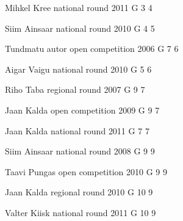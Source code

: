 \documentclass[11pt]{article}
\begin{document}
\ylDisplay{} %
{Mihkel Kree} %
{national round} %
{2011} %
{G 3} %
{4} %
{

\ifEngStatement
\fi
}

\ylDisplay{} %
{Siim Ainsaar} %
{national round} %
{2010} %
{G 4} %
{5} %
{

\ifEngStatement
\fi
}

\ylDisplay{} %
{Tundmatu autor} %
{open competition} %
{2006} %
{G 7} %
{6} %
{

\ifEngStatement
\fi
}

\ylDisplay{} %
{Aigar Vaigu} %
{national round} %
{2010} %
{G 5} %
{6} %
{

\ifEngStatement
\fi
}

\ylDisplay{} %
{Riho Taba} %
{regional round} %
{2007} %
{G 9} %
{7} %
{

\ifEngStatement
\fi
}

\ylDisplay{} %
{Jaan Kalda} %
{open competition} %
{2009} %
{G 9} %
{7} %
{

\ifEngStatement
\fi
}

\ylDisplay{} %
{Jaan Kalda} %
{national round} %
{2011} %
{G 7} %
{7} %
{

\ifEngStatement
\fi
}

\ylDisplay{} %
{Siim Ainsaar} %
{national round} %
{2008} %
{G 9} %
{9} %
{

\ifEngStatement
\fi
}

\ylDisplay{} %
{Taavi Pungas} %
{open competition} %
{2010} %
{G 9} %
{9} %
{

\ifEngStatement
\fi
}

\ylDisplay{} %
{Jaan Kalda} %
{regional round} %
{2010} %
{G 10} %
{9} %
{

\ifEngStatement
\fi
}

\ylDisplay{} %
{Valter Kiisk} %
{national round} %
{2011} %
{G 10} %
{9} %
{

\ifEngStatement
\fi
}
\end{document}
